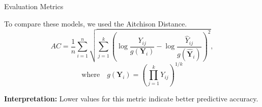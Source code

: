 \begin{frame}{Evaluation Metrics}

To compare these models, we used  the Aitchison Distance.
\vspace{0.2cm}
\[
AC = \frac{1}{n} \sum_{i=1}^n \sqrt{\sum_{j=1}^k \left(\log\frac{Y_{ij}}{g(\mathbf{Y}_i)} - \log\frac{\hat{Y}_{ij}}{g(\hat{\mathbf{Y}}_i)}\right)^2},
\]
\[
\text{where} \quad g(\mathbf{Y}_i) = \left(\prod_{j=1}^k Y_{ij}\right)^{1/k}
\]


\vspace{0.3cm}
\textbf{Interpretation:} Lower values for this metric indicate better predictive accuracy.
\end{frame}








